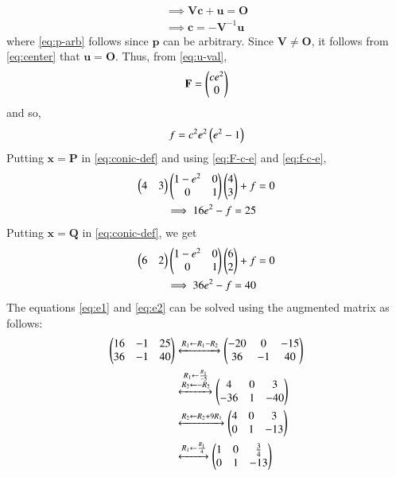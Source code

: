 \documentclass[journal,12pt,twocolumn]{IEEEtran}
\renewcommand{\vec}[1]{\boldsymbol{\mathbf{#1}}}
\begin{document}
\begin{enumerate}
\begin{align}
        \implies \vec{Vc} + \vec{u} = \vec{O} \label{eq:p-arb} \\
        \implies \vec{c} = -\vec{V}^{-1}\vec{u}
        \label{eq:center}
    \end{align}
    where \eqref{eq:p-arb} follows since $\vec{p}$ can be arbitrary. Since
    $\vec{V} \neq \vec{O}$, it follows from \eqref{eq:center} that $\vec{u}
    = \vec{O}$. Thus, from \eqref{eq:u-val},
    \begin{align}
        \vec{F} = \myvec{ce^2\\0}
        \label{eq:F-c-e}
    \end{align}
    and so,
    \begin{align}
        f = c^2e^2\left(e^2-1\right)
        \label{eq:f-c-e}
    \end{align}
    Putting $\vec{x} = \vec{P}$ in \eqref{eq:conic-def} and using \eqref{eq:F-c-e}
    and \eqref{eq:f-c-e},
    \begin{align}
        \begin{pmatrix}4&3\end{pmatrix}\begin{pmatrix}1-e^2&0\\0&1\end{pmatrix}\begin{pmatrix}4\\3\end{pmatrix} + f &= 0 \\
        \implies 16e^2 - f = 25 \label{eq:e1}
    \end{align}
    Putting $\vec{x} = \vec{Q}$ in \eqref{eq:conic-def}, we get
    \begin{align}
        \begin{pmatrix}6&2\end{pmatrix}\begin{pmatrix}1-e^2&0\\0&1\end{pmatrix}\begin{pmatrix}6\\2\end{pmatrix} + f &= 0 \\
        \implies 36e^2 - f = 40 \label{eq:e2}
    \end{align}
    The equations \eqref{eq:e1} and \eqref{eq:e2} can be solved using the 
    augmented matrix as follows:
    \begin{align}
        \myvec{16&-1&25\\36&-1&40} &\xleftrightarrow[]{R_1\leftarrow R_1-R_2} \myvec{-20&0&-15\\36&-1&40} \\
                 &\xleftrightarrow[]{\substack{R_1\leftarrow\frac{R_1}{-5}\\R_2\leftarrow -R_2}} \myvec{4&0&3\\-36&1&-40} \\
                 &\xleftrightarrow[]{R_2\leftarrow R_2+9R_1}\myvec{4&0&3\\0&1&-13} \\
                 &\xleftrightarrow[]{R_1\leftarrow\frac{R_1}{4}}\myvec{1&0&\frac{3}{4}\\0&1&-13} \\

\end{align}
\end{enumerate}
\end{document}

